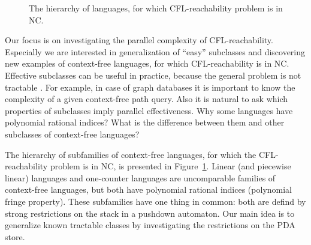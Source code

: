 \documentclass[smallextended]{svjour3}       %
\begin{document}
\begin{figure}
\centering
{}
\caption{The hierarchy of languages, for which CFL-reachability problem is in NC.}
\label{hierarchy}      
\end{figure}
Our focus is on investigating the parallel complexity of CFL-reachability. Especially we are interested in generalization of ``easy'' subclasses and discovering new examples of context-free languages, for which CFL-reachability is in NC. Effective subclasses can be useful in practice, because the general problem is not tractable \cite{ExperimentalCFPQ}. For example, in case of graph databases it is important to know the complexity of a given context-free path query. Also it is natural to ask which properties of subclasses imply parallel effectiveness. Why some languages have polynomial rational indices? What is the difference between them and other subclasses of context-free languages?


The hierarchy of subfamilies of context-free languages, for which the CFL-reachability problem is in NC, is presented in Figure~\ref{hierarchy}. Linear (and piecewise linear) languages and one-counter languages are uncomparable families of context-free languages, but both have polynomial rational indices (polynomial fringe property). These subfamilies have one thing in common: both are defind by strong restrictions on the stack in a pushdown automaton. Our main idea is to generalize known tractable classes by investigating the restrictions on the PDA store.
\end{document}
